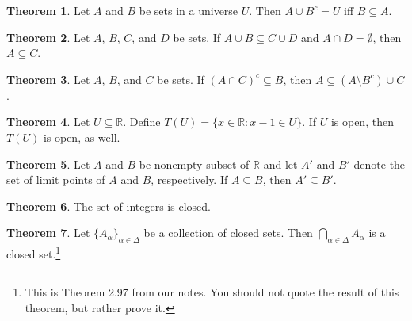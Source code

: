 \documentclass[11pt]{article}
\theoremstyle{definition}
\newtheorem{theorem}{Theorem}
\begin{document}
\begin{theorem}
Let $A$ and $B$ be sets in a universe $U$.  Then $A\cup B^{c}=U$ iff $B\subseteq A$.
\end{theorem}

\begin{theorem}
Let $A$, $B$, $C$, and $D$ be sets.  If $A\cup B\subseteq C\cup D$ and $A\cap D=\emptyset$, then $A\subseteq C$.
\end{theorem}

\begin{theorem}
Let $A$, $B$, and $C$ be sets.  If $(A\cap C)^{c}\subseteq B$, then $A\subseteq (A\setminus B^{c})\cup C$.
\end{theorem}

\begin{theorem}
Let $U\subseteq \mathbb{R}$.  Define $T(U)=\{x\in \mathbb{R}:x-1\in U\}$.  If $U$ is open, then $T(U)$ is open, as well.
\end{theorem}


\begin{theorem}
Let $A$ and $B$ be nonempty subset of $\mathbb{R}$ and let $A'$ and $B'$ denote the set of limit points of $A$ and $B$, respectively.  If $A\subseteq B$, then $A'\subseteq B'$.
\end{theorem}

\begin{theorem}
The set of integers is closed.
\end{theorem}

\begin{theorem}
Let $\{A_{\alpha}\}_{\alpha\in\Delta}$ be a collection of closed sets.  Then $\displaystyle \bigcap_{\alpha\in \Delta} A_{\alpha}$ is a closed set.\footnote{This is Theorem 2.97 from our notes.  You should not quote the result of this theorem, but rather prove it.}
\end{theorem}
\end{document}
